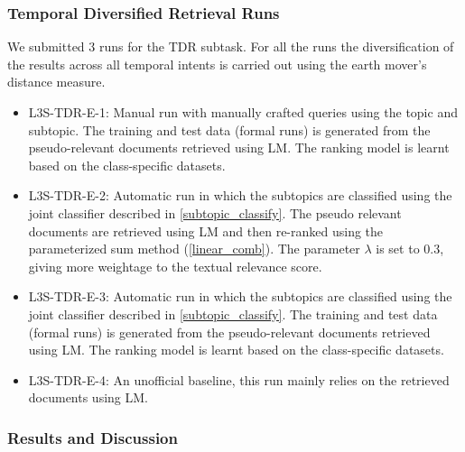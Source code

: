 \documentclass{sig-alternate}
\begin{document}
\subsubsection{Temporal Diversified Retrieval Runs}
We submitted 3 runs for the TDR subtask. For all the runs the diversification of the results across all temporal intents is carried out using the earth mover's distance measure.
\begin{itemize}
\item \textsf{L3S-TDR-E-1}: Manual run with manually crafted queries using the topic and subtopic. The training and test data (formal runs) is generated from the pseudo-relevant documents retrieved using LM. The ranking model is learnt based on the class-specific datasets.
\item \textsf{L3S-TDR-E-2}: Automatic run in which the subtopics are classified using the joint classifier described in \ref{subtopic_classify}. The pseudo relevant documents are retrieved using LM and then re-ranked using the parameterized sum method (\ref{linear_comb}). The parameter $\lambda$ is set to 0.3, giving more weightage to the textual relevance score.
\item \textsf{L3S-TDR-E-3}: Automatic run in which the subtopics are classified using the joint classifier described in \ref{subtopic_classify}. The training and test data (formal runs) is generated from the pseudo-relevant documents retrieved using LM. The ranking model is learnt based on the class-specific datasets.
\item \textsf{L3S-TDR-E-4}: An unofficial baseline, this run mainly relies on the retrieved documents using LM.
\end{itemize}
\subsubsection{Results and Discussion}
\end{document}
